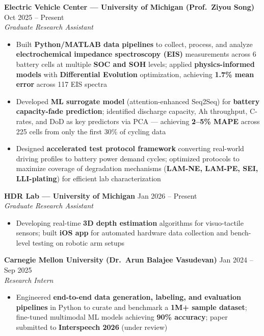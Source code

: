 \documentclass[9pt]{article}
\begin{document}
\textbf{Electric Vehicle Center --- University of Michigan (Prof.\ Ziyou Song)} \hfill Oct 2025 -- Present\\
\emph{Graduate Research Assistant}
\vspace{-2mm}
\begin{itemize}[leftmargin=*,noitemsep,topsep=1pt]
  \item Built \textbf{Python/MATLAB data pipelines} to collect, process, and analyze \textbf{electrochemical impedance spectroscopy (EIS)} measurements across 6 battery cells at multiple \textbf{SOC and SOH} levels; applied \textbf{physics-informed models} with \textbf{Differential Evolution} optimization, achieving \textbf{1.7\% mean error} across 117 EIS spectra
  \item Developed \textbf{ML surrogate model} (attention-enhanced Seq2Seq) for \textbf{battery capacity-fade prediction}; identified discharge capacity, Ah throughput, C-rates, and DoD as key predictors via PCA --- achieving \textbf{2--5\% MAPE} across 225 cells from only the first 30\% of cycling data
  \item Designed \textbf{accelerated test protocol framework} converting real-world driving profiles to battery power demand cycles; optimized protocols to maximize coverage of degradation mechanisms (\textbf{LAM-NE, LAM-PE, SEI, LLI-plating}) for efficient lab characterization
\end{itemize}

\vspace{-1mm}
\textbf{HDR Lab --- University of Michigan} \hfill Jan 2026 -- Present\\
\emph{Graduate Research Assistant}
\vspace{-2mm}
\begin{itemize}[leftmargin=*,noitemsep,topsep=1pt]
  \item Developing real-time \textbf{3D depth estimation} algorithms for visuo-tactile sensors; built \textbf{iOS app} for automated hardware data collection and bench-level testing on robotic arm setups
\end{itemize}

\vspace{-1mm}
\textbf{Carnegie Mellon University (Dr.\ Arun Balajee Vasudevan)} \hfill Jan 2024 -- Sep 2025\\
\emph{Research Intern}
\vspace{-2mm}
\begin{itemize}[leftmargin=*,noitemsep,topsep=1pt]
  \item Engineered \textbf{end-to-end data generation, labeling, and evaluation pipelines} in Python to curate and benchmark a \textbf{1M+ sample dataset}; fine-tuned multimodal ML models achieving \textbf{90\% accuracy}; paper submitted to \textbf{Interspeech 2026} (under review)
\end{itemize}
\end{document}
